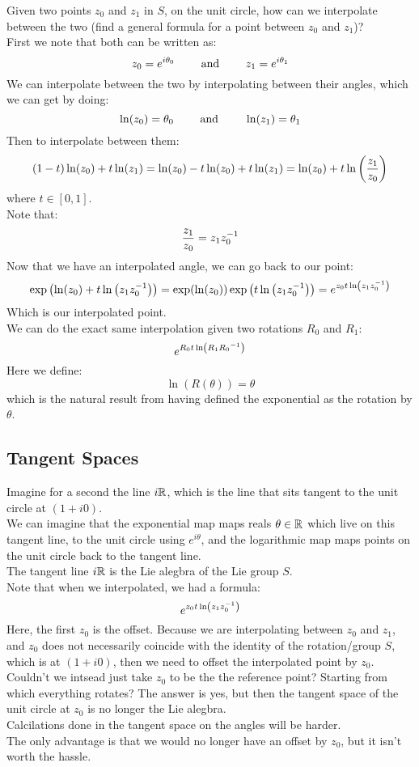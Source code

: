 \documentclass[12pt]{article}
\begin{document}
Given two points $z_0$ and $z_1$ in $S$,
on the unit circle, how can we interpolate
between the two (find a general formula
for a point between $z_0$ and $z_1$)? \\

First we note that both can be written as:
\[ z_0 = e^{i\theta_0} \qquad \text{ and } \qquad
z_1 = e^{i\theta_1} \]
We can interpolate between the two
by interpolating between their angles,
which we can get by doing:
\[ \ln(z_0) = \theta_0 \qquad \text{ and } \qquad 
\ln(z_1) = \theta_1 \]
Then to interpolate between them:
\[ (1-t)\ln(z_0) + t\ln(z_1)
= \ln(z_0) -t\ln(z_0) + t\ln(z_1) 
= \ln(z_0) + t\ln\left( \dfrac{z_1}{z_0} \right) \]
where $t \in [0, 1]$. \\
Note that:
\[ \dfrac{z_1}{z_0} = z_1z_0^{-1} \]
Now that we have an interpolated angle,
we can go back to our point:
\[ \exp\left( \ln(z_0) + t\ln\left( z_1z_0^{-1} \right) \right)
= \exp(\ln(z_0))
\exp\left( {t\ln\left( z_1z_0^{-1} \right)}  \right)
= e^{{z_0t\ln\left( z_1z_0^{-1} \right)}} \]
Which is our interpolated point. \\

We can do the exact same interpolation
given two rotations $R_0$ and $R_1$:
\[ e^{{R_0t\ln\left( {R_1}{R_0}^{-1} \right)}} \]
Here we define:
\[ \ln(R(\theta)) = \theta \]
which is the natural result from having
defined the exponential as the
rotation by $\theta$. \\

\newpage

\subsection*{Tangent Spaces}

Imagine for a second the line $i\mathbb{R}$,
which is the line that sits tangent
to the unit circle at $(1 + i0)$. \\
We can imagine that the exponential map
maps reals $\theta \in \mathbb{R}$ which live on this
tangent line, to the unit circle using
$e^{i\theta}$,
and the logarithmic map maps points on the
unit circle back to the tangent line. \\
The tangent line $i\mathbb{R}$ is the Lie alegbra
of the Lie group $S$. \\

Note that when we interpolated,
we had a formula:
\[ e^{{z_0t\ln\left( z_1z_0^{-1} \right)}} \]
Here, the first $z_0$ is the offset.
Because we are interpolating between $z_0$
and $z_1$, and $z_0$
does not necessarily coincide with the
identity of the rotation/group $S$,
which is at $(1 + i0)$,
then we need to offset the interpolated point
by $z_0$. \\
Couldn't we intsead just take $z_0$ to
be the the reference point?
Starting from which everything rotates?
The answer is yes, but then the tangent
space of the unit circle at $z_0$
is no longer the Lie alegbra. \\
Calcilations done in the tangent space 
on the angles will be harder. \\
The only advantage is that we would no longer
have an offset by $z_0$,
but it isn't worth the hassle. \\
\end{document}
